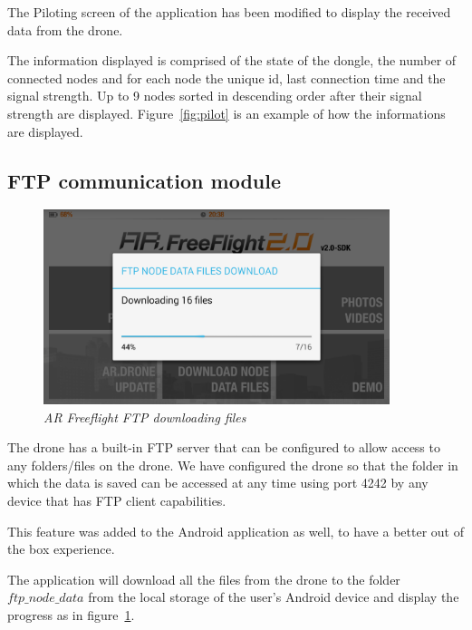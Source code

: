 The Piloting screen of the application has been modified to display the received data from the drone.

The information displayed is comprised of the state of the dongle, the number of connected nodes and for each node the unique id, last connection time and the signal strength. Up to 9 nodes sorted in descending order after their signal strength are displayed. Figure~\ref{fig:pilot} is an example of how the informations are displayed.

\subsection{FTP communication module}

\begin{figure}[ht]
\begin{center}
\includegraphics[width=0.9\textwidth]{img/android_ftp.png}
\end{center}
\caption{\small \itshape{AR Freeflight FTP downloading files}}
  \label{fig:ftp}
\end{figure}

The drone has a built-in FTP server that can be configured to allow access to any folders/files on the drone. We have configured the drone so that the folder in which the data is saved can be accessed at any time using port 4242 by any device that has FTP client capabilities. 

This feature was added to the Android application as well, to have a better out of the box experience.

The application will download all the files from the drone to the folder $ftp\_node\_data$ from the local storage of the user's Android device and display the progress as in figure~\ref{fig:ftp}.

